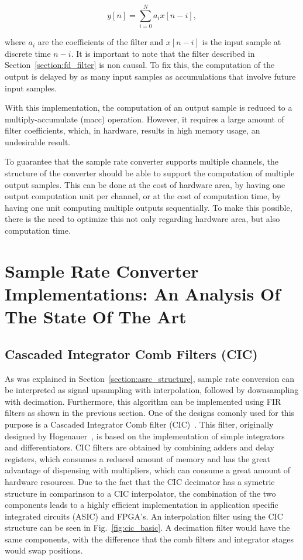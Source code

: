 \begin{equation}
  y[n] = \sum_{i=0}^N a_i x[n-i],
  \label{eq:macc}
\end{equation}

where $a_i$ are the coefficients of the filter and $x[n-i]$ is the input sample
at discrete time $n-i$. It is important to note that the filter described in
Section~\ref{section:fd_filter} is non causal. To fix this, the computation of
the output is delayed by as many input samples as accumulations that involve
future input samples.

With this implementation, the computation of an output sample is reduced to a
multiply-accumulate (macc) operation. However, it requires a large amount of
filter coefficients, which, in hardware, results in high memory usage, an
undesirable result.

To guarantee that the sample rate converter supports multiple
channels, the structure of the converter should be able to support the computation
of multiple output samples. This can be done at the cost of hardware area,
by having one output computation unit per channel, or at the cost of computation
time, by having one unit computing multiple outputs sequentially. To make
this possible, there is the need to optimize this not only regarding hardware
area, but also computation time.

\section{Sample Rate Converter Implementations: An Analysis Of The State Of The Art}
\label{section:implementation}

\subsection{Cascaded Integrator Comb Filters (CIC)}

As was explained in Section~\ref{section:asrc_structure}, sample rate conversion
can be interpreted as signal upsampling with interpolation, followed by
downsampling with decimation. Furthermore, this algorithm can be implemented
using FIR filters as shown in the previous section. One of the designs comonly
used for this purpose is a Cascaded Integrator Comb filter
(CIC)~\cite{charanjit:impl}. This filter, originally designed by Hogenauer~\cite{hogenauer},
is based on the implementation of simple integrators and
differentiators.  CIC filters are obtained by combining adders and delay
registers, which consumes a reduced amount of memory and has the great advantage
of dispensing with multipliers, which can consume a great amount of hardware
resources. Due to the fact that the CIC decimator has a symetric structure in
comparinson to a CIC interpolator, the combination of the two components leads
to a highly efficient implementation in application specific integrated circuits
(ASIC) and FPGA's. An interpolation filter using the CIC structure can be seen
in Fig.~\ref{fig:cic_basic}. A decimation filter would have the same components,
with the difference that the comb filters and integrator stages would swap
positions.

